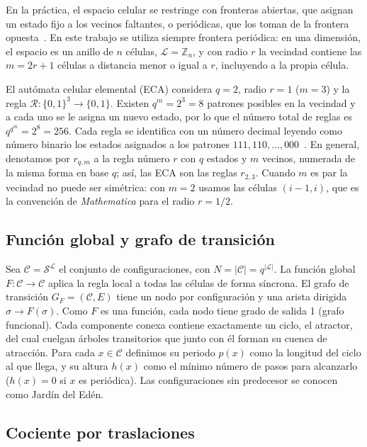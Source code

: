 En la práctica, el espacio celular se restringe con fronteras abiertas, que asignan un estado fijo a los vecinos faltantes, o periódicas, que los toman de la frontera opuesta~\cite{bhattacharjee2019_ca,ponce2015_ca}. En este trabajo se utiliza siempre frontera periódica: en una dimensión, el espacio es un anillo de $n$ células, $\mathcal{L} = \mathbb{Z}_n$, y con radio $r$ la vecindad contiene las $m = 2r + 1$ células a distancia menor o igual a $r$, incluyendo a la propia célula.

El autómata celular elemental (ECA) considera $q = 2$, radio $r = 1$ ($m = 3$) y la regla $\mathcal{R} : \{0,1\}^3 \to \{0,1\}$. Existen $q^{m} = 2^3 = 8$ patrones posibles en la vecindad y a cada uno se le asigna un nuevo estado, por lo que el número total de reglas es $q^{q^{m}} = 2^8 = 256$. Cada regla se identifica con un número decimal leyendo como número binario los estados asignados a los patrones $111, 110, \dots, 000$~\cite{Wolfram2002_nks}. En general, denotamos por $r_{q,m}$ a la regla número $r$ con $q$ estados y $m$ vecinos, numerada de la misma forma en base $q$; así, las ECA son las reglas $r_{2,3}$. Cuando $m$ es par la vecindad no puede ser simétrica: con $m = 2$ usamos las células $(i-1, i)$, que es la convención de \textit{Mathematica} para el radio $r = 1/2$.

\subsection{Función global y grafo de transición}

Sea $\mathcal{C} = \mathcal{S}^{\mathcal{L}}$ el conjunto de configuraciones, con $N = |\mathcal{C}| = q^{|\mathcal{L}|}$. La función global $F : \mathcal{C} \to \mathcal{C}$ aplica la regla local a todas las células de forma síncrona. El grafo de transición $G_F = (\mathcal{C}, E)$ tiene un nodo por configuración y una arista dirigida $\sigma \to F(\sigma)$. Como $F$ es una función, cada nodo tiene grado de salida 1 (grafo funcional). Cada componente conexa contiene exactamente un ciclo, el atractor, del cual cuelgan árboles transitorios que junto con él forman su cuenca de atracción. Para cada $x \in \mathcal{C}$ definimos su periodo $p(x)$ como la longitud del ciclo al que llega, y su altura $h(x)$ como el mínimo número de pasos para alcanzarlo ($h(x) = 0$ si $x$ es periódica). Las configuraciones sin predecesor se conocen como Jardín del Edén.

\subsection{Cociente por traslaciones}
\label{subsec:quotient}

